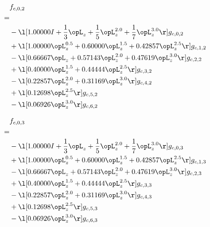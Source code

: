 \begin{alignat}{2} 
\label{eq:f_02_0} 
& f_{c,0,2} \nonumber \\ 
 = \\ 
& - \l[  1.00000 I + \frac{1}{3} \opL_z + \frac{1}{5} \opL_z^{2.0} + \frac{1}{7} \opL_z^{3.0}  \r] g_{c,0,2} \nonumber \\ 
& + \l[  1.00000 \opL_z^{0.5} +  0.60000 \opL_z^{1.5} +  0.42857 \opL_z^{2.5}  \r] g_{c,1,2} \nonumber \\ 
& - \l[  0.66667 \opL_z +  0.57143 \opL_z^{2.0} +  0.47619 \opL_z^{3.0}  \r] g_{c,2,2} \nonumber \\ 
& + \l[  0.40000 \opL_z^{1.5} +  0.44444 \opL_z^{2.5}  \r] g_{c,3,2} \nonumber \\ 
& - \l[  0.22857 \opL_z^{2.0} +  0.31169 \opL_z^{3.0}  \r] g_{c,4,2} \nonumber \\ 
& + \l[  0.12698 \opL_z^{2.5}  \r] g_{c,5,2} \nonumber \\ 
& - \l[  0.06926 \opL_z^{3.0}  \r] g_{c,6,2} \nonumber \\ 
\end{alignat} 


\begin{alignat}{2} 
\label{eq:f_03_0} 
& f_{c,0,3} \nonumber \\ 
 = \\ 
& - \l[  1.00000 I + \frac{1}{3} \opL_z + \frac{1}{5} \opL_z^{2.0} + \frac{1}{7} \opL_z^{3.0}  \r] g_{c,0,3} \nonumber \\ 
& + \l[  1.00000 \opL_z^{0.5} +  0.60000 \opL_z^{1.5} +  0.42857 \opL_z^{2.5}  \r] g_{c,1,3} \nonumber \\ 
& - \l[  0.66667 \opL_z +  0.57143 \opL_z^{2.0} +  0.47619 \opL_z^{3.0}  \r] g_{c,2,3} \nonumber \\ 
& + \l[  0.40000 \opL_z^{1.5} +  0.44444 \opL_z^{2.5}  \r] g_{c,3,3} \nonumber \\ 
& - \l[  0.22857 \opL_z^{2.0} +  0.31169 \opL_z^{3.0}  \r] g_{c,4,3} \nonumber \\ 
& + \l[  0.12698 \opL_z^{2.5}  \r] g_{c,5,3} \nonumber \\ 
& - \l[  0.06926 \opL_z^{3.0}  \r] g_{c,6,3} \nonumber \\ 
\end{alignat} 


